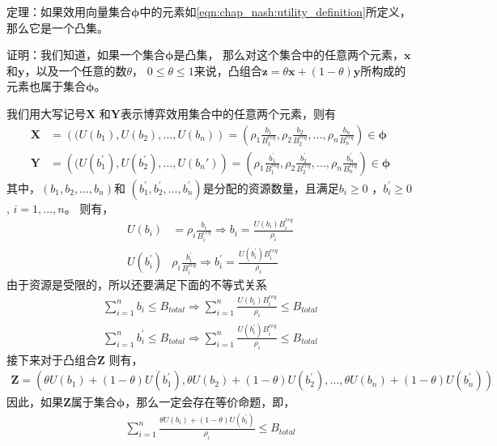 定理：如果效用向量集合$\mathbf{\phi}$中的元素如\eqref{eqn:chap_nash:utility_definition}所定义，那么它是一个凸集。

证明：我们知道，如果一个集合$\mathbf{\phi}$是凸集，
那么对这个集合中的任意两个元素，$\mathbf{x}$和$\mathbf{y}$，以及一个任意的数$\theta$， $0\le \theta\le 1$来说，凸组合$\mathbf{z}=\theta \mathbf{x} + (1-\theta) \mathbf{y}$所构成的元素也属于集合$\mathbf{\phi}$。

我们用大写记号$\mathbf{X}$ 和$\mathbf{Y}$表示博弈效用集合中的任意两个元素，则有
\begin{align*}
    \mathbf{X} &=\left( (U(b_1), U(b_2), \ldots, U(b_n) \right)
    = \left( \rho_1 \frac{b_1}{B_1^{req}},\rho_2 \frac{b_2}{B_2^{req}},\ldots, \rho_n \frac{b_n}{B_n^{req}} \right) \in \mathbf{\phi} \\
    \mathbf{Y} &=\left( (U(b_1^\prime), U(b_2^\prime), \ldots, U(b_n\prime) \right)
    = \left( \rho_1 \frac{b_1^\prime}{B_1^{req}},\rho_2 \frac{b_2^\prime}{B_2^{req}},\ldots, \rho_n \frac{b_n^\prime}{B_n^{req}} \right) \in \mathbf{\phi} 
\end{align*}
其中，$(b_1, b_2, \ldots, b_n)$和 $(b_1^\prime, b_2^\prime, \ldots, b_n^\prime)$是分配的资源数量，且满足$b_i \ge 0$ ，$b_i^\prime \ge 0$, $i = 1, \ldots, n$。
则有，
\begin{align*}
    U(b_i) &= \rho_i \frac{b_i}{B_i^{req}} \Rightarrow b_i = \frac{U(b_i)B_i^{req}}{\rho_i} \\
    U(b_i^\prime) & \rho_i \frac{b_i^\prime} {B_i^{req}} \Rightarrow b_i^\prime = \frac{U(b_i^\prime) B_i^{req}}{\rho_i}
\end{align*}
由于资源是受限的，所以还要满足下面的不等式关系
\begin{align*}
    \sum_{i=1}^n b_i \le B_{total} \Rightarrow \sum_{i=1}^n \frac{U(b_i)B_i^{req}}{\rho_i} \le B_{total}\\
    \sum_{i=1}^n b_i^\prime \le B_{total}\Rightarrow \sum_{i=1}^n \frac{U(b_i^\prime)B_i^{req}}{\rho_i} \le B_{total}
\end{align*}
接下来对于凸组合$\mathbf{Z}$ 则有，
\begin{align*}
    \mathbf{Z} = \left( \theta U(b_1) + (1-\theta) U(b_1^\prime),   \theta U(b_2) + (1-\theta) U(b_2^\prime), \ldots,  \theta U(b_n) + (1-\theta) U(b_n^\prime) \right)
\end{align*}
因此，如果$\mathbf{Z}$属于集合$\mathbf{\phi}$，那么一定会存在等价命题，即，
\begin{align}
    \sum_{i=1}^{n} \frac{ \theta U(b_i) + (1-\theta) U(b_i^\prime)}{\rho_i}  \le B_{total}
    \label{eqn:chap_nash:proof_z_in_s}
\end{align}

